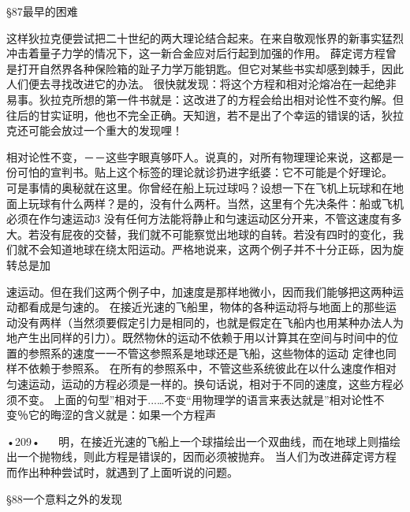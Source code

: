 §87最早的困难

这样狄拉克便尝试把二十世纪的两大理论结合起来。在来自敬观怅界的新事实猛烈冲击着量子力学的情况下，这一新合金应对后行起到加强的作用。
薛定谔方程曾是打开自然界各种保险箱的趾子力学万能钥匙。但它对某些书实却感到棘手，因此人们便去寻找改进它的办法。
很快就发现：将这个方程和相对沦熔冶在一起绝非易事。狄拉克所想的第一件书就是：这改进了的方程会给出相对论性不变彴解。但往后的甘实证明，他也不完全正确。天知逍，若不是出了个幸运的错误的话，狄拉克还可能会放过一个重大的发现哩！

 
相对论性不变，－－这些字眼真够吓人。说真的，对所有物理理论来说，这都是一份可怕的宣判书。贴上这个标签的理论就诊扔进字纸婆：它不可能是个好理论。
可是事情的奥秘就在这里。你曾经在船上玩过球吗？设想一下在飞机上玩球和在地面上玩球有什么两样？是的，没有什么两杆。当然，这里有个先决条件：船或飞机必须在作匀速运动3
没有任何方法能将静止和匀速运动区分开来，不管这速度有多大。若没有屁夜的交替，我们就不可能察觉出地球的自转。若没有四时的变化，我们就不会知道地球在绕太阳运动。严格地说来，这两个例子并不十分正砾，因为旋转总是加

速运动。但在我们这两个例子中，加速度是那样地微小，因而我们能够把这两种运动都看成是匀速的。
在接近光速的飞船里，物体的各种运动将与地面上的那些运动没有两样（当然须要假定引力是相同的，也就是假定在飞船内也用某种办法人为地产生出同样的引力）。既然物休的运动不依赖于用以计算其在空间与时间中的位置的参照系的速度一一不管这参照系是地球还是飞船，这些物体的运动
定律也同样不依赖于参照系。
在所有的参照系中，不管这些系统彼此在以什么速度作相对匀速运动，运动的方程必须是一样的。换句话说，相对于不同的速度，这些方程必须不变。
上面的句型”相对于...…不变“用物理学的语言来表达就是”相对论性不变％它的晦涩的含义就是：如果一个方程声

•209•
  
明，在接近光速的飞船上一个球描绘出一个双曲线，而在地球上则描绘出一个抛物线，则此方程是错误的，因而必须被抛弃。
当人们为改进薛定谔方程而作出种种尝试时，就遇到了上面听说的问题。

§88一个意料之外的发现

